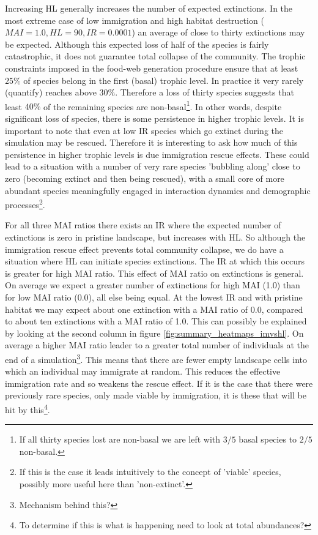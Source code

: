 \begin{itemize}
Increasing HL generally increases the number of expected extinctions. In the most extreme case of low immigration and high habitat destruction ($MAI=1.0,HL=90,IR=0.0001$) an average of close to thirty extinctions may be expected. Although this expected loss of half of the species is fairly catastrophic, it does not guarantee total collapse of the community. The trophic constraints imposed in the food-web generation procedure ensure that at least $25\%$ of species belong in the first (basal) trophic level. In practice it very rarely (quantify) reaches above $30\%$. Therefore a loss of thirty species suggests that least $40\%$ of the remaining species are non-basal\footnote{If all thirty species lost are non-basal we are left with $3/5$ basal species to $2/5$ non-basal.}. In other words, despite significant loss of species, there is some persistence in higher trophic levels. It is important to note that even at low IR species which go extinct during the simulation may be rescued. Therefore it is interesting to ask how much of this persistence in higher trophic levels is due immigration rescue effects. These could lead to a situation with a number of very rare species 'bubbling along' close to zero (becoming extinct and then being rescued), with a small core of more abundant species meaningfully engaged in interaction dynamics and demographic processes\footnote{If this is the case it leads intuitively to the concept of 'viable' species, possibly more useful here than 'non-extinct'.}.

For all three MAI ratios there exists an IR where the expected number of extinctions is zero in pristine landscape, but increases with HL. So although the immigration rescue effect prevents total community collapse, we do have a situation where HL can initiate species extinctions. The IR at which this occurs is greater for high MAI ratio. This effect of MAI ratio on extinctions is general. On average we expect a greater number of extinctions for high MAI (1.0) than for low MAI ratio (0.0), all else being equal. At the lowest IR and with pristine habitat we may expect about one extinction with a MAI ratio of 0.0, compared to about ten extinctions with a MAI ratio of 1.0. This can possibly be explained by looking at the second column in figure \ref{fig:summary_heatmaps_imvshl}. On average a higher MAI ratio leader to a greater total number of individuals at the end of a simulation\footnote{Mechanism behind this?}. This means that there are fewer empty landscape cells into which an individual may immigrate at random. This reduces the effective immigration rate and so weakens the rescue effect. If it is the case that there were previously rare species, only made viable by immigration, it is these that will be hit by this\footnote{To determine if this is what is happening need to look at total abundances?}. 


\end{itemize}
